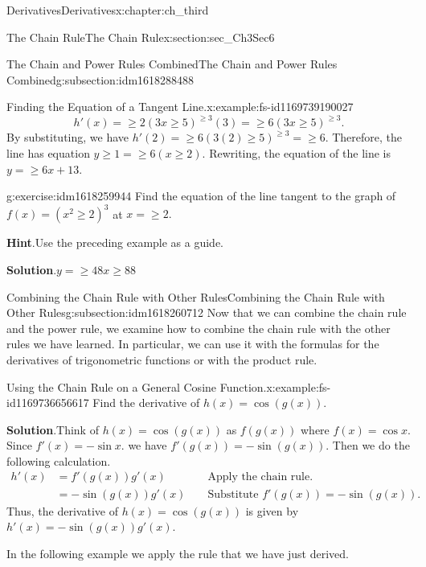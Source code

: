 \documentclass[oneside,10pt,]{book}
\newcommand{\blocktitlefont}{\relax}
\numberwithin{equation}{section}
\newcommand{\amp}{&}
\begin{document}
\begin{chapterptx}{Derivatives}{}{Derivatives}{}{}{x:chapter:ch_third}
\begin{sectionptx}{The Chain Rule}{}{The Chain Rule}{}{}{x:section:sec_Ch3Sec6}
\begin{subsectionptx}{The Chain and Power Rules Combined}{}{The Chain and Power Rules Combined}{}{}{g:subsection:idm1618288488}
\begin{example}{Finding the Equation of a Tangent Line.}{x:example:fs-id1169739190027}
\begin{equation*}
h'(x)=\geq 2(3x\geq 5)^{\geq 3}(3)=\geq 6(3x\geq 5)^{\geq 3}.
\end{equation*}
By substituting, we have \(h'(2)=\geq 6(3(2)\geq 5)^{\geq 3}=\geq 6.\) Therefore, the line has equation \(y\geq 1=\geq 6(x\geq 2).\) Rewriting, the equation of the line is \(y=\geq 6x+13.\)%
\end{example}
\begin{inlineexercise}{}{g:exercise:idm1618259944}%
Find the equation of the line tangent to the graph of \(f(x)=(x^2\geq 2)^3\) at \(x=\geq 2.\)%
\par\smallskip%
\noindent\textbf{\blocktitlefont Hint}.\hypertarget{g:hint:idm1618258920}{}\quad{}Use the preceding example as a guide.%
\par\smallskip%
\noindent\textbf{\blocktitlefont Solution}.\hypertarget{g:solution:idm1618259688}{}\quad{}\(y=\geq 48x\geq 88\)%
\end{inlineexercise}%
\end{subsectionptx}
%
%
\typeout{************************************************}
\typeout{************************************************}
%
\begin{subsectionptx}{Combining the Chain Rule with Other Rules}{}{Combining the Chain Rule with Other Rules}{}{}{g:subsection:idm1618260712}
Now that we can combine the chain rule and the power rule, we examine how to combine the chain rule with the other rules we have learned. In particular, we can use it with the formulas for the derivatives of trigonometric functions or with the product rule.%
\begin{example}{Using the Chain Rule on a General Cosine Function.}{x:example:fs-id1169736656617}%
Find the derivative of \(h(x)=\cos (g(x)).\)%
\par\smallskip%
\noindent\textbf{\blocktitlefont Solution}.\hypertarget{g:solution:idm1618256744}{}\quad{}Think of \(h(x)=\cos(g(x))\) as \(f(g(x))\) where \(f(x)=\cos x.\) Since \(f'(x)=-\sin x.\) we have \(f'(g(x))=-\sin (g(x)).\) Then we do the following calculation.%
%
\begin{align*}
h'(x)\amp=f'(g(x))g'(x)\amp \amp \text{ Apply the chain rule. }\\
\amp =-\sin (g(x))g'(x)\amp\amp\text{ Substitute } f'(g(x))=-\sin (g(x)).
\end{align*}
Thus, the derivative of \(h(x)=\cos (g(x))\) is given by \(h'(x)=-\sin (g(x))g'(x).\)%
\end{example}
In the following example we apply the rule that we have just derived.%

\end{subsectionptx}
\end{sectionptx}
\end{chapterptx}
\end{document}
